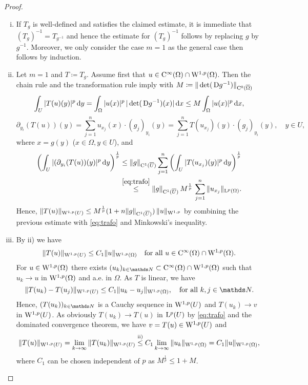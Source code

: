 \begin{proof}
  \begin{enumerate}[i)]
    \item If $T_g$ is well-defined and satisfies the claimed estimate, it is immediate that $(T_g)^{-1} = T_{g^{-1}}$ and hence the estimate for $(T_g)^{-1}$ follows by replacing $g$ by $g^{-1}$.
      Moreover, we only consider the case $m = 1$ as the general case then follows by induction.
    \item Let $m = 1$ and $T \coloneqq T_g$.
      Assume first that $u \in \mathrm{C}^\infty(\Omega) \cap \mathrm{W}^{1,p}(\Omega)$.
      Then the chain rule and the transformation rule imply with $M \coloneqq \|\det(\,{\operatorname{D}} g^{-1})\|_{\mathrm{C}^0(\overline{\Omega})}$
  \begin{equation}
    \label{eq:trafo}
    \int_U |T(u)(y)|^p \, {\operatorname{d}\!{y}}
     = \int_\Omega |u(x)|^p \, |\det(\,{\operatorname{D}} g^{-1})(x)| \, {\operatorname{d}\!{x}}
    \leq M \int_\Omega |u(x)|^p \, {\operatorname{d}\!{x}},
  \end{equation}
  $$
  \partial_{y_i} (T(u))(y)
  = \sum_{j = 1}^n u_{x_j}(x) \cdot (g_j)_{y_i}(y)
  = \sum_{j = 1}^n T(u_{x_j})(y) \cdot (g_j)_{y_i}(y), \quad y \in U,
  $$
  where $x = g(y)$ ($x \in \Omega, y \in U$), and
  \begin{align*}
    \left( \int_U |(\partial_{y_i}(T(u))(y)|^p \, {\operatorname{d}\!{y}}\right)^{\frac{1}{p}}
    & \leq \|g\|_{\mathrm{C}^1(\overline U)} \sum_{j = 1}^n \left( \int_U |T(u_{x_j})(y)|^p \, {\operatorname{d}\!{y}} \right)^{\frac{1}{p}} \\
    & \overset{\eqref{eq:trafo}}{\leq} \|g\|_{\mathrm{C}^1(\overline U)} \, M^{\frac{1}{p}} \, \sum_{j = 1}^n \|u_{x_j} \|_{\mathrm{L}^p(\Omega)}.
  \end{align*}
  Hence, $\|T(u)\|_{\mathrm{W}^{1,p}(U)} \leq M^{\frac{1}{p}} (1 + n\|g\|_{\mathrm{C}^1(\overline U)}) \, \|u\|_{\mathrm{W}^{1,p}}$ by combining the previous estimate with \eqref{eq:trafo} and Minkowski's inequality.
\item By ii) we have
  $$
  \|T(u)\|_{\mathrm{W}^{1,p}(U)} \leq C_1 \|u\|_{\mathrm{W}^{1,p}(\Omega)} \quad \text{for all } u \in \mathrm{C}^\infty(\Omega) \cap \mathrm{W}^{1,p}(\Omega).
  $$
  For $u \in \mathrm{W}^{1,p}(\Omega)$ there exists $(u_k)_{k \in \N} \subset \CC^\infty(\Omega) \cap \WW^{1,p}(\Omega)$ such that $u_k \to u$ in $\mathrm{W}^{1,p}(\Omega)$ and a.e. in $\Omega$.
  As $T$ is linear, we have
  $$
  \| T(u_k) - T(u_j)\|_{\WW^{1,p}(U)} \leq C_1 \|u_k - u_j\|_{\WW^{1,p}(\Omega)}, \quad\text{for all } k,j \in \N.
  $$
  Hence, $(T(u_k))_{k \in \N}$ is a Cauchy sequence in $\mathrm{W}^{1,p}(U)$ and $T(u_k) \to v$ in $\mathrm{W}^{1,p}(U)$.
  As obviously $T(u_k) \to T(u)$ in $\mathrm{L}^p(U)$ by \eqref{eq:trafo} and the dominated convergence theorem, we have $v = T(u) \in \mathrm{W}^{1,p}(U)$ and 
  $$
  \| T(u) \|_{\mathrm{W}^{1,p}(U)} 
  = \lim_{k \to \infty} \|T(u_k)\|_{\mathrm{W}^{1,p}(U)}
      \overset{\text{ii)}}\leq C_1 \lim_{k \to \infty} \|u_k\|_{\mathrm{W}^{1,p}(\Omega)}
  = C_1 \|u\|_{\mathrm{W}^{1,p}(\Omega)},
  $$
  where $C_1$ can be chosen independent of $p$ as $M^{\frac{1}{p}} \leq 1 + M$. \qedhere
  \end{enumerate}
\end{proof}

